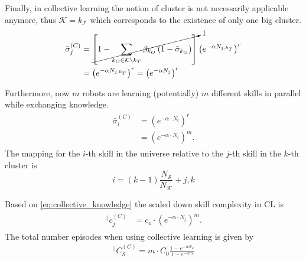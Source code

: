 Finally, in collective learning the notion of cluster is not necessarily applicable anymore, thus 
$\mathcal{K} = k_\mathcal{T}$ which corresponds to the existence of only one big cluster.
\begin{align}
	\begin{split}
		\bar{\sigma}_j^{(C)} &=   \cancelto{1}{ \left[1- \sum_{k_O \in \mathcal{K} \setminus k_T}\beta_{k_O} \left( 1 - \bar{\sigma}_{k_O} \right)\right]} \left(e^{-\alpha {N_{j,k_T}}} \right)^r \\
		&= \left(e^{-\alpha N_{j,k_T}} \right)^r  = \left(e^{-\alpha N_{j}}\right)^r 
	\end{split}
\end{align}

Furthermore, now $m$ robots are learning (potentially) $m$ different skills in parallel while exchanging knowledge.
\begin{align}\label{eq:collective_knowledge}
\begin{split}
    \bar{\sigma}_i^{(C)} &= \left({e^{-\alpha \cdot N_i}}\right)^{r}\\
    &= \left({e^{-\alpha \cdot N_i}}\right)^{m}.
\end{split}
\end{align}
The mapping for the $i$-th skill in the universe relative to the $j$-th skill in the $k$-th cluster is
\begin{equation}
    i = (k-1)\frac{N_\mathcal{S}}{N_\mathcal{K}} + j,k
\end{equation}

Based on \eqref{eq:collective_knowledge} the scaled down skill complexity in CL is 
\begin{align}\label{eq:collective_knowledge}
\begin{split}
    ^{||}c_j^{(C)} &= c_o \cdot \left({e^{-\alpha \cdot N_j}}\right)^{m}.
\end{split}
\end{align}
The total number episodes when using collective learning is given by
\begin{eqnarray}
	^{||}C_\mathcal{S}^{(C)} = m \cdot C_0 \frac{1 - e^{-\alpha N_\mathcal{S}}}{1 - e^{-\alpha m}}
\end{eqnarray}

